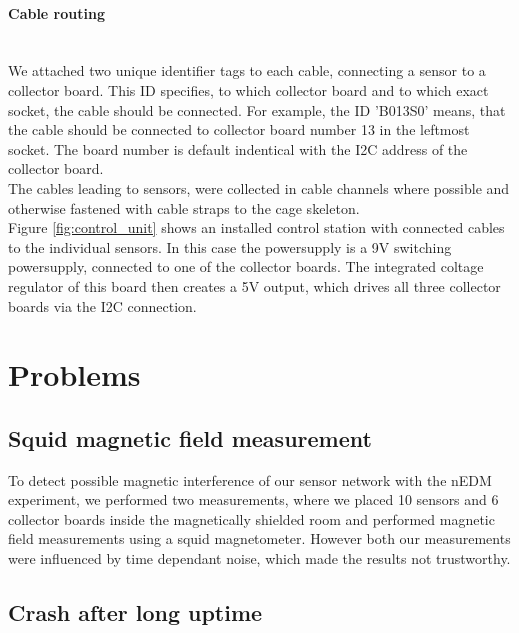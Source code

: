 \documentclass[a4paper]{scrreprt}
\begin{document}
\paragraph{Cable routing}\hspace{1cm}\\
We attached two unique identifier tags to each cable, connecting a sensor to a collector
board. This ID specifies, to which collector board and to which exact socket,
the cable should be connected. For example, the ID 'B013S0' means, that the cable should
be connected to collector board number 13 in the leftmost socket. The board number is default indentical with the I2C address of the collector board.\\
The cables leading to sensors, were collected in cable channels where possible and otherwise
fastened with cable straps to the cage skeleton.\\
Figure \ref{fig:control_unit} shows an installed control station with connected cables to
the individual sensors. In this case the powersupply is a 9V switching powersupply, connected
to one of the collector boards. The integrated coltage regulator of this board then creates
a 5V output, which drives all three collector boards via the I2C connection.
\section{Problems}
\subsection{Squid magnetic field measurement}
To detect possible magnetic interference of our sensor network with the nEDM experiment,
we performed two measurements, where
we placed 10 sensors and 6 collector boards inside the magnetically shielded room and performed
magnetic field measurements using a squid magnetometer. However both our measurements were
influenced by time dependant noise, which made the results not trustworthy.
\subsection{Crash after long uptime}
\end{document}
